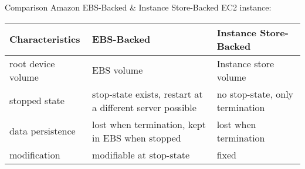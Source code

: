 Comparison Amazon EBS-Backed \& Instance Store-Backed EC2 instance:

\begin{table}[H]
	\begin{center}
	\begin{tabular}{|l|p{5cm}|p{5cm}|}
		\hline
		Characteristics  &EBS-Backed  & Instance Store-Backed \\ \hline
		root device volume        &EBS volume  & Instance store volume   \\ \hline
		stopped state     & stop-state exists, restart at a different server possible  & no stop-state, only termination    \\ \hline
		data persistence       & lost when termination, kept in EBS when stopped  & lost when termination   \\ \hline
		modification  & modifiable at stop-state  & fixed    \\ \hline
	\end{tabular}
\end{center}
\end{table}

